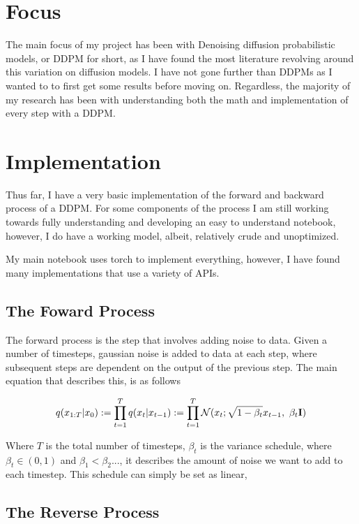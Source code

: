 \documentclass[conference]{IEEEtran}
\begin{document}
\section {Focus}

The main focus of my project has been with Denoising diffusion probabilistic models, or DDPM for short, as I have found the most literature revolving around this variation on diffusion models. I have not gone further than DDPMs as I wanted to to first get some results before moving on. Regardless, the majority of my research has been with understanding both the math and implementation of every step with a DDPM\cite{nain2022-2}\cite{nain2022-3}\cite{ho2020denoising}.

\section {Implementation}

Thus far, I have a very basic implementation of the forward and backward process of a DDPM. For some components of the process I am still working towards fully understanding and developing an easy to understand notebook, however, I do have a working model, albeit, relatively crude and unoptimized.

My main notebook uses torch to implement everything, however, I have found many implementations that use a variety of APIs.

\subsection{The Foward Process}

The forward process is the step that involves adding noise to data. Given a number of timesteps, gaussian noise is added to data at each step, where subsequent steps are dependent on the output of the previous step. The main equation that describes this, is as follows

$$
    q(x_{1:T}\vert x_{0})
    := \prod_{t=1}^{T}q(x_{t}\vert x_{t-1})
    :=\prod_{t=1}^{T}\mathcal{N}(x_{t};\sqrt{1-\beta_{t}} x_{t-1},\ \beta_{t}\bf I)
$$

Where $T$ is the total number of timesteps, $\beta_t$ is the variance schedule, where $\beta_t \in (0,1)$ and $\beta_{1} < \beta_{2}...$, it describes the amount of noise we want to add to each timestep. This schedule can simply be set as linear, 

\subsection{The Reverse Process}





\end{document}
